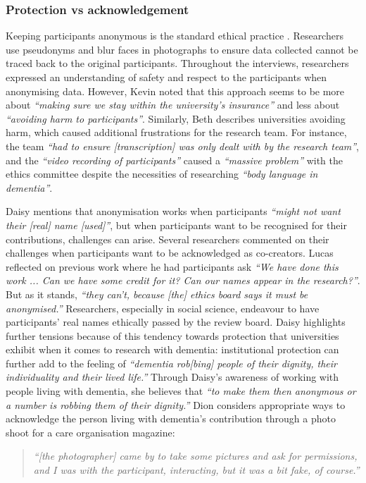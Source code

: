 \subsubsection{Protection vs acknowledgement}
\label{Ethics:ThemeOnePartThree}

Keeping participants anonymous is the standard ethical practice \citep{novak_anonymity_2014}. Researchers use pseudonyms and blur faces in photographs to ensure data collected cannot be traced back to the original participants. Throughout the interviews, researchers expressed an understanding of safety and respect to the participants when anonymising data. However, Kevin noted that this approach seems to be more about \textit{``making sure we stay within the university's insurance''} and less about \textit{``avoiding harm to participants''}. Similarly, Beth describes universities avoiding harm, which caused additional frustrations for the research team. For instance, the team \textit{``had to ensure [transcription] was only dealt with by the research team''}, and the \textit{``video recording of participants''} caused a \textit{``massive problem''} with the ethics committee despite the necessities of researching \textit{``body language in dementia''}. 

Daisy mentions that anonymisation works when participants \textit{``might not want their [real] name [used]''}, but when participants want to be recognised for their contributions, challenges can arise. Several researchers commented on their challenges when participants want to be acknowledged as co-creators. Lucas reflected on previous work where he had participants ask \textit{``We have done this work ... Can we have some credit for it? Can our names appear in the research?''}. But as it stands, \textit{``they can't, because [the] ethics board says it must be anonymised.''} Researchers, especially in social science, endeavour to have participants' real names ethically passed by the review board. Daisy highlights further tensions because of this tendency towards protection that universities exhibit when it comes to research with dementia: institutional protection can further add to the feeling of \textit{``dementia rob[bing] people of their dignity, their individuality and their lived life.''} Through Daisy's awareness of working with people living with dementia, she believes that \textit{``to make them then anonymous or a number is robbing them of their dignity.''} Dion considers appropriate ways to acknowledge the person living with dementia's contribution through a photo shoot for a care organisation magazine: 
\begin{quote}
\textit{``[the photographer] came by to take some pictures and ask for permissions, and I was with the participant, interacting, but it was a bit fake, of course.'' 
}
\end{quote}

